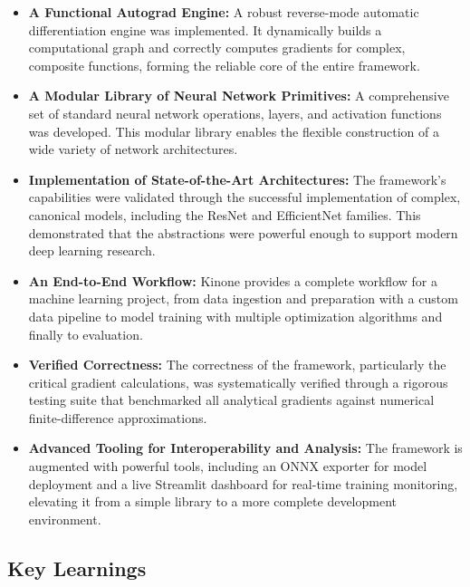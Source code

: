 \documentclass[a4paper]{article}
\begin{document}
\begin{itemize}
    \item \textbf{A Functional Autograd Engine:} A robust reverse-mode automatic differentiation engine was implemented. It dynamically builds a computational graph and correctly computes gradients for complex, composite functions, forming the reliable core of the entire framework.

    \item \textbf{A Modular Library of Neural Network Primitives:} A comprehensive set of standard neural network operations, layers, and activation functions was developed. This modular library enables the flexible construction of a wide variety of network architectures.

    \item \textbf{Implementation of State-of-the-Art Architectures:} The framework's capabilities were validated through the successful implementation of complex, canonical models, including the ResNet and EfficientNet families. This demonstrated that the abstractions were powerful enough to support modern deep learning research.

    \item \textbf{An End-to-End Workflow:} Kinone provides a complete workflow for a machine learning project, from data ingestion and preparation with a custom data pipeline to model training with multiple optimization algorithms and finally to evaluation.

    \item \textbf{Verified Correctness:} The correctness of the framework, particularly the critical gradient calculations, was systematically verified through a rigorous testing suite that benchmarked all analytical gradients against numerical finite-difference approximations.

    \item \textbf{Advanced Tooling for Interoperability and Analysis:} The framework is augmented with powerful tools, including an ONNX exporter for model deployment and a live Streamlit dashboard for real-time training monitoring, elevating it from a simple library to a more complete development environment.
\end{itemize}

\subsection{Key Learnings}
\end{document}
